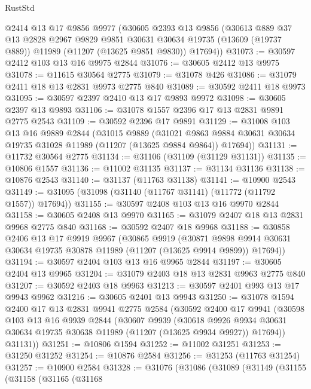 \begin{lexlean}{RustStd}
\begin{coremodule}
    @2414
    @13
    @17
    @9856
    @9977
    (@30605
      @2393
      @13
      @9856
      (@30613
        @889
        @37
        @13
        @2828
        @2967
        @9829
        @9851
        @30631
        @30634
        @19735
        (@13609 (@19737 @889))
        @11989
        (@11207 (@13625 @9851 @9830))
        @17694))
@31073 := @30597 @2412 @103 @13 @16 @9975 @2844
@31076 := @30605 @2412 @13 @9975
@31078 := @11615 @30564 @2775
@31079 := @31078 @426
@31086 := @31079 @2411 @18 @13 @2831 @9973 @2775 @840
@31089 := @30592 @2411 @18 @9973
@31095 := @30597 @2397 @2410 @13 @17 @9893 @9972
@31098 := @30605 @2397 @13 @9893
@31106 := @31078 @1557 @2396 @17 @13 @2831 @9891 @2775 @2543
@31109 := @30592 @2396 @17 @9891
@31129 := @31008
    @103
    @13
    @16
    @9889
    @2844
    (@31015
      @9889
      (@31021 @9863 @9884 @30631 @30634 @19735 @31028 @11989 (@11207 (@13625 @9884 @9864)) @17694))
@31131 := @11732 @30564 @2775
@31134 := @31106 (@31109 (@31129 @31131))
@31135 := @10806 @1557
@31136 := @11002 @31135
@31137 := @31134 @31136
@31138 := @10876 @2543
@31140 := @31137 (@11763 @31138)
@31141 := @10900 @2543
@31149 := @31095 (@31098 (@31140 (@11767 @31141) (@11772 (@11792 @1557)) @17694))
@31155 := @30597 @2408 @103 @13 @16 @9970 @2844
@31158 := @30605 @2408 @13 @9970
@31165 := @31079 @2407 @18 @13 @2831 @9968 @2775 @840
@31168 := @30592 @2407 @18 @9968
@31188 := @30858
    @2406
    @13
    @17
    @9919
    @9967
    (@30865
      @9919
      (@30871 @9898 @9914 @30631 @30634 @19735 @30878 @11989 (@11207 (@13625 @9914 @9899)) @17694))
@31194 := @30597 @2404 @103 @13 @16 @9965 @2844
@31197 := @30605 @2404 @13 @9965
@31204 := @31079 @2403 @18 @13 @2831 @9963 @2775 @840
@31207 := @30592 @2403 @18 @9963
@31213 := @30597 @2401 @993 @13 @17 @9943 @9962
@31216 := @30605 @2401 @13 @9943
@31250 := @31078
    @1594
    @2400
    @17
    @13
    @2831
    @9941
    @2775
    @2584
    (@30592
      @2400
      @17
      @9941
      (@30598
        @103
        @13
        @16
        @9939
        @2844
        (@30607
          @9939
          (@30618
            @9926
            @9934
            @30631
            @30634
            @19735
            @30638
            @11989
            (@11207 (@13625 @9934 @9927))
            @17694))
        @31131))
@31251 := @10806 @1594
@31252 := @11002 @31251
@31253 := @31250 @31252
@31254 := @10876 @2584
@31256 := @31253 (@11763 @31254)
@31257 := @10900 @2584
@31328 := @31076
    (@31086
      (@31089
        (@31149
          (@31155
            (@31158
              (@31165
                (@31168

\end{coremodule}
\end{lexlean}
